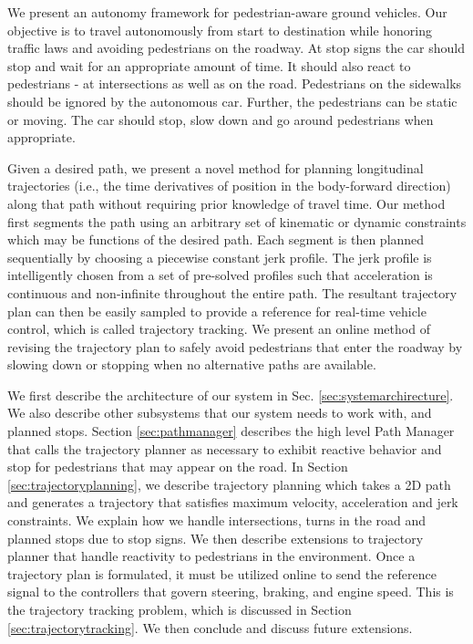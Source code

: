 \documentclass[letterpaper, 10 pt, conference]{ieeeconf}  %
\begin{document}
We present an autonomy framework for pedestrian-aware ground vehicles.
Our objective is to travel autonomously from start to destination while honoring traffic laws and avoiding pedestrians on the roadway.
At stop signs the car should stop and wait for an appropriate amount of time.
It should also react to pedestrians - at intersections as well as on the road.
Pedestrians on the sidewalks should be ignored by the autonomous car.
Further, the pedestrians can be static or moving.
The car should stop, slow down and go around pedestrians when appropriate.

Given a desired path, we present a novel method for planning longitudinal trajectories (i.e., the time derivatives of position in the body-forward direction) along that path without requiring prior knowledge of travel time.
Our method first segments the path using an arbitrary set of kinematic or dynamic constraints which may be functions of the desired path.
Each segment is then planned sequentially by choosing a piecewise constant jerk profile.
The jerk profile is intelligently chosen from a set of pre-solved profiles such that acceleration is continuous and non-infinite throughout the entire path.
The resultant trajectory plan can then be easily sampled to provide a reference for real-time vehicle control, which is called trajectory tracking.
We present an online method of revising the trajectory plan to safely avoid pedestrians that enter the roadway by slowing down or stopping when no alternative paths are available.

We first describe the architecture of our system in Sec. \ref{sec:systemarchirecture}.
We also describe other subsystems that our system needs to work with, and planned stops.
Section \ref{sec:pathmanager} describes the high level Path Manager that calls the trajectory planner as necessary to 
exhibit reactive behavior and stop for pedestrians that may appear on the road.
In Section \ref{sec:trajectoryplanning}, we describe trajectory planning which takes a 2D path and generates a trajectory that satisfies maximum velocity, acceleration and jerk constraints. 
We explain how we handle intersections, turns in the road and planned stops due to stop signs.
We then describe extensions to trajectory planner that handle reactivity to pedestrians in the environment. 
Once a trajectory plan is formulated, it must be utilized online to send the reference signal to the controllers that govern steering, braking, and engine speed.
This is the trajectory tracking problem, which is discussed in Section \ref{sec:trajectorytracking}.
We then conclude and discuss future extensions.
\end{document}
